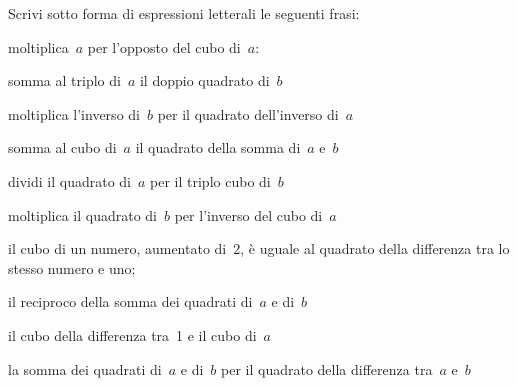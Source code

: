 \begin{multicols}{2}
\begin{esercizio}
\label{ese:8.12}
Scrivi sotto forma di espressioni letterali le seguenti frasi:
 \begin{enumeratea}
 \item moltiplica~$a$ per l'opposto del cubo di~$a$:
 \item somma al triplo di~$a$ il doppio quadrato di~$b$
 \item moltiplica l'inverso di~$b$ per il quadrato dell'inverso di~$a$
 \item somma al cubo di~$a$ il quadrato della somma di~$a$ e~$b$
 \item dividi il quadrato di~$a$ per il triplo cubo di~$b$
 \item moltiplica il quadrato di~$b$ per l'inverso del cubo di~$a$
 \item il cubo di un numero, aumentato di~2, è uguale al quadrato della 
   differenza tra lo stesso numero e uno;
 \item il reciproco della somma dei quadrati di~$a$ e di~$b$
 \item il cubo della differenza tra~1 e il cubo di~$a$
 \item la somma dei quadrati di~$a$ e di~$b$ per il quadrato della 
   differenza tra~$a$ e~$b$
 \end{enumeratea}
\end{esercizio}
\end{multicols}

